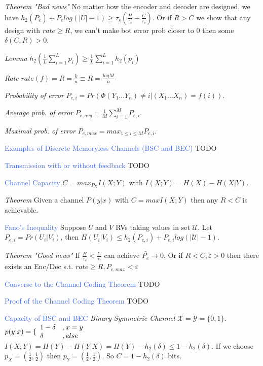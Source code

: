 \documentclass[10pt,a4paper,landscape]{article}
\newcommand{\concept}[1]{\textcolor{RoyalBlue}{#1}}
\newcommand{\subconcept}[1]{\textcolor{PineGreen}{\textit{#1}}}
\begin{document}
\begin{multicols*}{4}
\subconcept{Theorem "Bad news"} No matter how the encoder and decoder are designed, we have $h_2(\bar{P_e})+P_e log(|U|-1) \ge \tau_s (\frac{H}{\tau_s}-\frac{C}{\tau_c})$.
Or if $R>C$ we show that any design with $rate \ge R$, we can't make bot error prob closer to 0 then some $\delta (C,R)>0$.

\subconcept{Lemma} $h_2(\frac{1}{L} \sum_{i=1}^L p_i) \ge \frac{1}{L}\sum_{i=1}^L h_2(p_i)$

\subconcept{Rate} $rate(f)=R=\frac{k}{n} \equiv R=\frac{log M}{n}$


\subconcept{Probability of error} $P_{e,i}= Pr(\Phi(Y_1...Y_n) \neq i | (X_1...X_n)=f(i))$.

\subconcept{Average prob. of error} $P_{e,avg}=\frac{1}{M}\sum_{i=1}^M P_{e,i}$.

\subconcept{Maximal prob. of error} $P_{e,max}=max_{1 \le i \le M} P_{e,i}$.


\concept{Examples of Discrete Memoryless Channels (BSC and BEC)} TODO

\concept{Transmission with or without feedback} TODO

\concept{Channel Capacity} 
$C=max_{P_X} I(X;Y)$ with $I(X;Y)=H(X)-H(X|Y)$.

\subconcept{Theorem} Given a channel $P(y|x)$ with $C=max I(X;Y)$ then any $R<C$ is achievable.

\concept{Fano's Inequality}
Suppose $U$ and $V$ RVs taking values in set $\mathcal{U}$. Let $P_{e,i}=Pr(U_i|V_i)$, then $H(U_i|V_i) \le h_2(P_{e,i})+P_{e,i} log(|\mathcal{U}|-1)$.

\subconcept{Theorem "Good news"} If $\frac{H}{\tau_s}<\frac{C}{\tau_c}$ can achieve $\bar{P_e}\to 0$. 
Or if $R<C, \varepsilon > 0$ then there exists an Enc/Dec s.t. $rate \ge R, P_{e,max}<\varepsilon$

\concept{Converse to the Channel Coding Theorem	} TODO
			
\concept{Proof of the Channel Coding Theorem} TODO

\concept{Capacity of BSC and BEC } 
\subconcept{Binary Symmetric Channel}
$\mathcal{X}=\mathcal{Y}=\{0,1\}$.
$p(y|x)= \{
   \begin{array}{l l}
      1-\delta & ,x=y \\
      \delta & ,else 
   \end{array}$
$I(X;Y)=H(Y)-H(Y|X)=H(Y)-h_2(\delta) \le 1-h_2(\delta)$.
If we choose $p_X=(\frac{1}{2},\frac{1}{2})$ then $p_Y=(\frac{1}{2},\frac{1}{2})$.
So $C=1-h_2(\delta)$ bits.


\end{multicols*}
\end{document}
